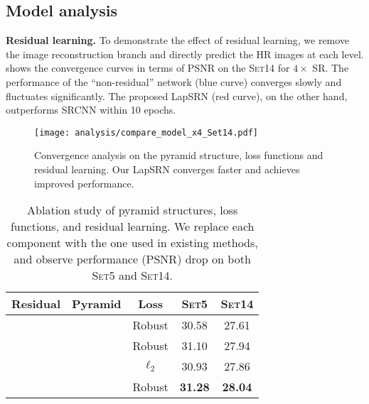 \documentclass[10pt,twocolumn,letterpaper]{article}
\begin{document}
	\subsection{Model analysis} 
	
	\noindent\textbf{Residual learning.} 
	To demonstrate the effect of residual learning, we remove the image reconstruction branch and directly predict the HR images at each level.
	 shows the convergence curves in terms of PSNR on the \textsc{Set14} for $4\times$ SR.
	The performance of the ``non-residual'' network (blue curve) converges slowly and fluctuates significantly. 
	The proposed LapSRN (red curve), on the other hand, outperforms SRCNN within 10 epochs.
	
	\begin{figure}[t]
		\centering
		\texttt{[image: analysis/compare\_model\_x4\_Set14.pdf]} 
		\vspace{-0.3cm}
		\caption{
			Convergence analysis on the pyramid structure, loss functions and residual learning.
			Our LapSRN converges faster and achieves improved performance.
		}
		\label{fig:compare_loss_curve}
	\end{figure}
	
	\begin{table}[t]
		\centering
		\caption{
			Ablation study of pyramid structures, loss functions, and residual learning.
			We replace each component with the one used in existing methods, and observe performance (PSNR) drop on both \textsc{Set5} and \textsc{Set14}.
		}
		\vspace{-2mm}
		\begin{tabular}{ccc|cc}
			\toprule
			Residual & Pyramid & Loss & \textsc{Set5} & \textsc{Set14} \\
			\midrule
			\checkmark & & Robust & 30.58 & 27.61 \\
			& \checkmark & Robust & 31.10 & 27.94 \\
			\checkmark & \checkmark & $\ell_2$ & 30.93 & 27.86 \\
			\checkmark & \checkmark & Robust & \textbf{31.28} & \textbf{28.04} \\
			\bottomrule
		\end{tabular}
		\label{tab:component-effect}
		\vspace{-5mm}
	\end{table}
	
	
	
\end{document}
